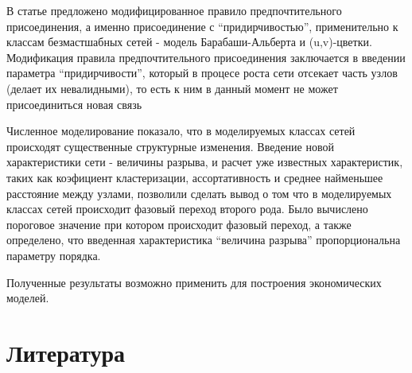 \documentclass[10pt,aps,pra]{revtex4-1}
\begin{document}
В статье предложено модифицированное правило предпочтительного присоединения, а именно присоединение с ``придирчивостью'', применительно к классам безмастшабных сетей - модель Барабаши-Альберта и (u,v)-цветки. Модификация правила предпочтительного присоединения заключается в введении параметра ``придирчивости'', который в процесе роста сети отсекает часть узлов (делает их невалидными),  то есть к ним в данный момент не может присоединиться новая связь

Численное моделирование показало, что в моделируемых классах сетей происходят существенные структурные изменения. Введение новой характеристики сети - величины разрыва, и расчет уже известных характеристик, таких как коэфициент кластеризации, ассортативность и среднее найменьшее расстояние между узлами, позволили сделать вывод о том что в моделируемых классах сетей происходит фазовый переход второго рода. Было вычислено пороговое значение при котором происходит фазовый переход, а также определено, что введенная характеристика ``величина разрыва'' пропорциональна параметру порядка.

Полученные результаты возможно применить для построения экономических моделей. 

\section{Литература}


 
\end{document}
